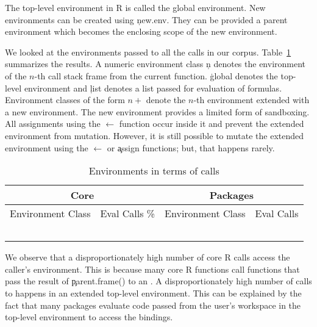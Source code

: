 \documentclass[screen,acmsmall]{acmart}
\begin{document}
The top-level environment in R is called the global environment. New
environments can be created using \c{new.env}. They can be provided a
parent environment which becomes the enclosing scope of the new
environment.

We looked at the environments passed to all the \eval calls in our corpus.
Table~\ref{tab:environments} summarizes the results. A numeric environment class
\c{n} denotes the environment of the $n$-th call stack frame from the current
function. \c{global} denotes the top-level environment and \c{list} denotes a
list passed for evaluation of formulas. Environment classes of the form $n+$
denote the $n$-th environment extended with a new environment. The new
environment provides a limited form of sandboxing. All assignments using the
$\leftarrow$ function occur inside it and prevent the extended environment from
mutation. However, it is still possible to mutate the extended environment using
the $\leftarrow$ or \c{assign} functions; but, that happens rarely.

\begin{table}[htbp]{ \centering
		\begin{tabular}{c|c|c|c}\hline
			\multicolumn{2}{c|}{Core} & \multicolumn{2}{|c}{Packages}  \\\hline
			Environment Class & Eval Calls \% & Environment Class & Eval Calls\\\hline
			\CoreEnvClassA & \CoreProportionA & \PackagesEnvClassA &  \PackagesProportionA\\
			\CoreEnvClassB & \CoreProportionB & \PackagesEnvClassB &  \PackagesProportionB\\
			\CoreEnvClassC & \CoreProportionC & \PackagesEnvClassC &  \PackagesProportionC\\
			\CoreEnvClassD & \CoreProportionD & \PackagesEnvClassD &  \PackagesProportionD\\
			\CoreEnvClassE & \CoreProportionE & \PackagesEnvClassE &  \PackagesProportionE\\\hline
	\end{tabular}} \label{tab:environments}
	\caption{Environments in terms of \eval calls}
\end{table}

We observe that a disproportionately high number of core R \eval calls
access the  caller's environment. This is because many core R
functions call functions that pass the result of \c{parent.frame()} to
an \eval. A disproportionately high number of calls to \eval happens
in an extended top-level environment. This can be explained by the
fact that many packages evaluate code passed from the user's workspace
in the top-level environment to access the bindings.
\end{document}
